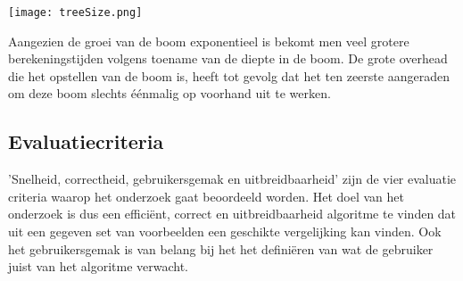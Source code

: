 \documentclass[Main.tex]{subfiles}
\begin{document}
\texttt{[image: treeSize.png]}

Aangezien de groei van de boom exponentieel is bekomt men veel grotere berekeningstijden volgens toename van de diepte in de boom. De grote overhead die het opstellen van de boom is, heeft tot gevolg dat het ten zeerste aangeraden om deze boom slechts \'e\'enmalig op voorhand uit te werken.

\subsection{Evaluatiecriteria}

'Snelheid, correctheid, gebruikersgemak en uitbreidbaarheid' zijn de vier evaluatie criteria waarop het onderzoek gaat beoordeeld worden. Het doel van het onderzoek is dus een effici\"ent, correct en uitbreidbaarheid algoritme te vinden dat uit een gegeven set van voorbeelden een geschikte vergelijking kan vinden. Ook het gebruikersgemak is van belang bij het het defini\"eren van wat de gebruiker juist van het algoritme verwacht.
\end{document}
